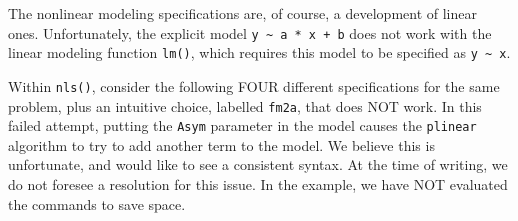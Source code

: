 \documentclass[
]{article}
\begin{document}
The nonlinear modeling specifications are, of course, a development of
linear ones. Unfortunately, the explicit model
\texttt{y\ \textasciitilde{}\ a\ *\ x\ +\ b} does not work with the
linear modeling function \texttt{lm()}, which requires this model to be
specified as \texttt{y\ \textasciitilde{}\ x}.

Within \texttt{nls()}, consider the following FOUR different
specifications for the same problem, plus an intuitive choice, labelled
\texttt{fm2a}, that does NOT work. In this failed attempt, putting the
\texttt{Asym} parameter in the model causes the \texttt{plinear}
algorithm to try to add another term to the model. We believe this is
unfortunate, and would like to see a consistent syntax. At the time of
writing, we do not foresee a resolution for this issue. In the example,
we have NOT evaluated the commands to save space.
\end{document}
